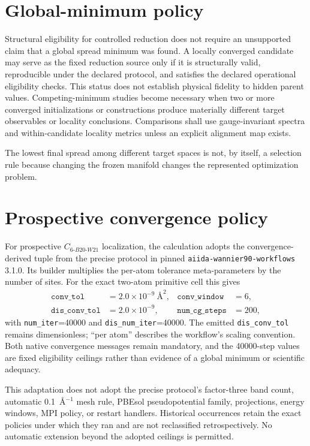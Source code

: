 \documentclass[11pt]{report}
\begin{document}
\chapter{Global-minimum policy}

Structural eligibility for controlled reduction does not require an unsupported claim
that a global spread minimum was found.  A locally converged candidate may serve as the
fixed reduction source only if it is structurally valid, reproducible under the declared
protocol, and satisfies the declared operational eligibility checks.  This status does
not establish physical fidelity to hidden parent values.  Competing-minimum studies
become necessary when two
or more converged initializations or constructions produce materially different target
observables or locality conclusions.  Comparisons shall use gauge-invariant spectra and
within-candidate locality metrics unless an explicit alignment map exists.

The lowest final spread among different target spaces is not, by itself, a selection
rule because changing the frozen manifold changes the represented optimization problem.

\chapter{Prospective convergence policy}

For prospective $C_{6\text{-}B20\text{-}W21}$ localization, the calculation adopts
the convergence-derived tuple from the precise protocol in pinned
\texttt{aiida-wannier90-workflows} 3.1.0.  Its builder multiplies the per-atom tolerance
meta-parameters by the number of sites.  For the exact two-atom primitive cell this
gives
\begin{align}
  \texttt{conv\_tol} &= 2.0\times10^{-9}\ \text{\AA}^{2}, &
  \texttt{conv\_window} &= 6, \\
  \texttt{dis\_conv\_tol} &= 2.0\times10^{-9}, &
  \texttt{num\_cg\_steps} &= 200,
\end{align}
with \texttt{num\_iter}=40000 and \texttt{dis\_num\_iter}=40000.  The emitted
\texttt{dis\_conv\_tol} remains dimensionless; ``per atom'' describes the workflow's
scaling convention.  Both native convergence messages remain mandatory, and the
40000-step values are fixed eligibility ceilings rather than evidence of a global
minimum or scientific adequacy.

This adaptation does not adopt the precise protocol's factor-three band count,
automatic 0.1~\AA$^{-1}$ mesh rule, PBEsol pseudopotential family, projections, energy
windows, MPI policy, or restart handlers.  Historical occurrences retain the exact
policies under which they ran and are not reclassified retrospectively.  No automatic
extension beyond the adopted ceilings is permitted.
\end{document}

